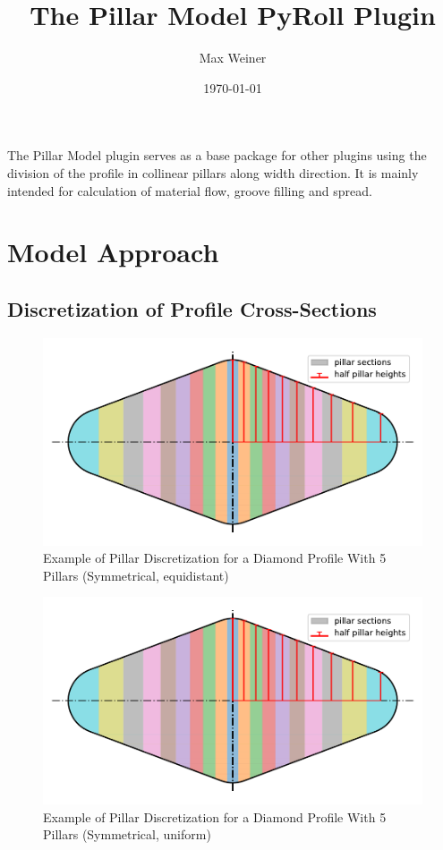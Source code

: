 \documentclass[11pt]{PyRollDocs}
\begin{document}
    \title{The Pillar Model PyRoll Plugin}
    \author{Max Weiner}
    \date{\today}

    \maketitle

    The Pillar Model plugin serves as a base package for other plugins using the division of the profile in collinear pillars along width direction.
    It is mainly intended for calculation of material flow, groove filling and spread.


    \section{Model Approach}\label{sec:model-approach}

    \subsection{Discretization of Profile Cross-Sections}\label{subsec:discretization-of-profile-cross-sections}

    \begin{figure}
        \centering
        \includegraphics[width=0.6\linewidth]{img/pillar_profile_equidistant}
        \caption{Example of Pillar Discretization for a Diamond Profile With 5 Pillars (Symmetrical, equidistant)}
        \label{fig:pillar_profile_equidistant}
    \end{figure}

    \begin{figure}
        \centering
        \includegraphics[width=0.6\linewidth]{img/pillar_profile_uniform}
        \caption{Example of Pillar Discretization for a Diamond Profile With 5 Pillars (Symmetrical, uniform)}
        \label{fig:pillar_profile_uniform}
    \end{figure}
\end{document}
